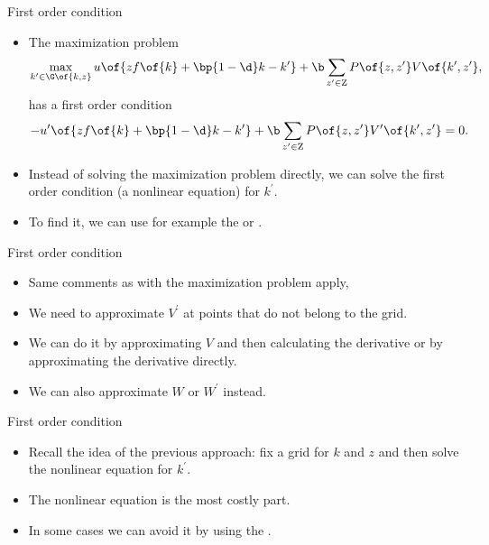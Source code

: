 \documentclass[11pt,xcolor={dvipsnames},aspectratio=159,hyperref={pdftex,pdfpagemode=UseNone,hidelinks,pdfdisplaydoctitle=true},usepdftitle=false]{beamer}
\begin{document}
\begin{frame}{First order condition}   
    \begin{itemize}
        \item The maximization problem 
        \begin{align*}
            \max_{k^\prime \in \G\of{k,z}} u\of{z f\of{k} + \bp{1-\d}k - k^\prime} + \b \sum_{z^\prime \in \text{Z}} P\of{z,z^\prime} V\of{k^\prime,z^\prime},
        \end{align*} has a first order condition             \begin{align*}
            - u^\prime\of{z f\of{k} + \bp{1-\d}k - k^\prime} + \b \sum_{z^\prime \in \text{Z}} P\of{z,z^\prime} V^\prime\of{k^\prime,z^\prime} = 0.
        \end{align*}
        \item Instead of solving the maximization problem directly, we can solve the first order condition (a nonlinear equation) for $k^\prime$.
        \item To find it, we can use for example the  or .
    \end{itemize}
    \end{frame}  


    \begin{frame}{First order condition}   
        \begin{itemize}
            \item Same comments as with the maximization problem apply,
            \item We need to approximate $V^\prime$ at points that do not belong to the grid.
            \item We can do it by approximating $V$ and then calculating the derivative or by approximating the derivative directly.
            \item We can also approximate $W$ or $W^\prime$ instead.
        \end{itemize}
        \end{frame}  

    \begin{frame}
        \end{frame}

        \begin{frame}{First order condition}   
            \begin{itemize}
                \item Recall the idea of the previous approach: fix a grid for $k$ and $z$ and then solve the nonlinear equation for $k^\prime$.
                \item The nonlinear equation is the most costly part. 
                \item In some cases we can avoid it by using the .
            \end{itemize}
            \end{frame}             
\end{document}
